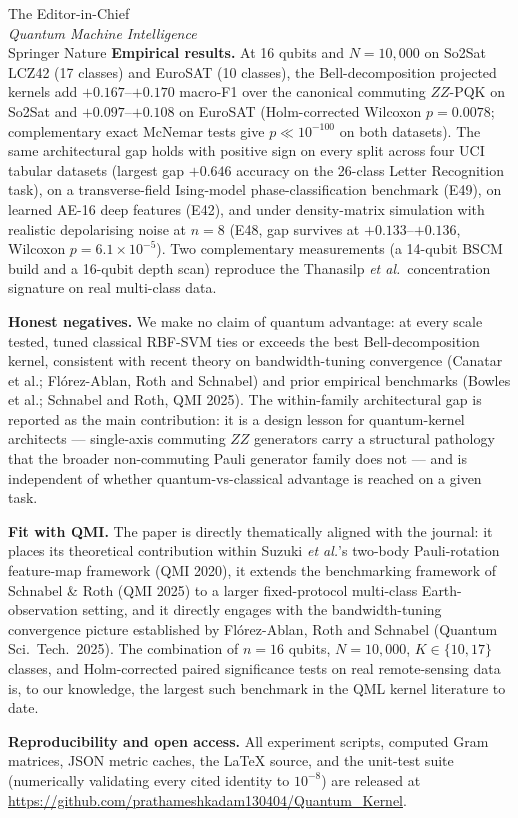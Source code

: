 \documentclass[11pt]{letter}
\begin{document}
\begin{letter}{The Editor-in-Chief\\
\emph{Quantum Machine Intelligence}\\
Springer Nature}
\medskip
\textbf{Empirical results.}
At 16 qubits and $N=10{,}000$ on So2Sat LCZ42 (17 classes) and EuroSAT (10 classes), the Bell-decomposition projected kernels add $+0.167$--$+0.170$ macro-F1 over the canonical commuting $ZZ$-PQK on So2Sat and $+0.097$--$+0.108$ on EuroSAT (Holm-corrected Wilcoxon $p = 0.0078$; complementary exact McNemar tests give $p \ll 10^{-100}$ on both datasets).  The same architectural gap holds with positive sign on every split across four UCI tabular datasets (largest gap $+0.646$ accuracy on the 26-class Letter Recognition task), on a transverse-field Ising-model phase-classification benchmark (E49), on learned AE-16 deep features (E42), and under density-matrix simulation with realistic depolarising noise at $n=8$ (E48, gap survives at $+0.133$--$+0.136$, Wilcoxon $p = 6.1\times 10^{-5}$).  Two complementary measurements (a 14-qubit BSCM build and a 16-qubit depth scan) reproduce the Thanasilp \emph{et al.}\ concentration signature on real multi-class data.

\medskip
\textbf{Honest negatives.}
We make no claim of quantum advantage: at every scale tested, tuned classical RBF-SVM ties or exceeds the best Bell-decomposition kernel, consistent with recent theory on bandwidth-tuning convergence (Canatar et al.; Fl{\'o}rez-Ablan, Roth and Schnabel) and prior empirical benchmarks (Bowles et al.; Schnabel and Roth, QMI 2025).  The within-family architectural gap is reported as the main contribution: it is a design lesson for quantum-kernel architects --- single-axis commuting $ZZ$ generators carry a structural pathology that the broader non-commuting Pauli generator family does not --- and is independent of whether quantum-vs-classical advantage is reached on a given task.

\medskip
\textbf{Fit with QMI.}
The paper is directly thematically aligned with the journal: it places its theoretical contribution within Suzuki \emph{et al.}'s two-body Pauli-rotation feature-map framework (QMI 2020), it extends the benchmarking framework of Schnabel \& Roth (QMI 2025) to a larger fixed-protocol multi-class Earth-observation setting, and it directly engages with the bandwidth-tuning convergence picture established by Fl{\'o}rez-Ablan, Roth and Schnabel (Quantum Sci.\ Tech.\ 2025).  The combination of $n = 16$ qubits, $N = 10{,}000$, $K\in\{10, 17\}$ classes, and Holm-corrected paired significance tests on real remote-sensing data is, to our knowledge, the largest such benchmark in the QML kernel literature to date.

\medskip
\textbf{Reproducibility and open access.}
All experiment scripts, computed Gram matrices, JSON metric caches, the LaTeX source, and the unit-test suite (numerically validating every cited identity to $10^{-8}$) are released at \url{https://github.com/prathameshkadam130404/Quantum_Kernel}.


\end{letter}
\end{document}
